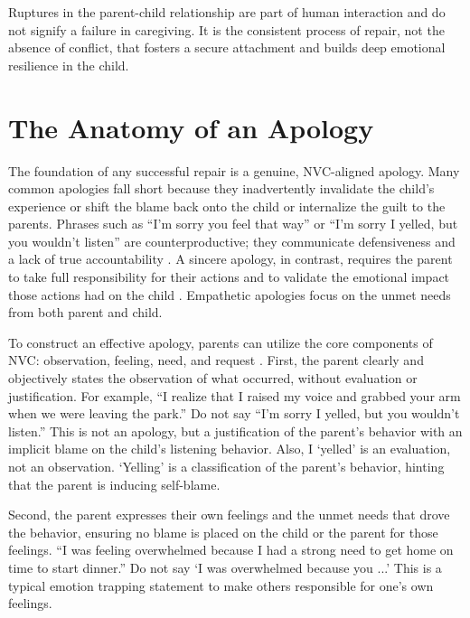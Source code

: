\begin{keyinsight}
Ruptures in the parent-child relationship are part of human interaction and do not signify a failure in caregiving.
It is the consistent process of repair, not the absence of conflict, that fosters a secure attachment and builds deep emotional resilience in the child.
\end{keyinsight}

\section{The Anatomy of an Apology}

The foundation of any successful repair is a genuine, NVC-aligned apology.
Many common apologies fall short because they inadvertently invalidate the child's experience or shift the blame back onto the child or internalize the guilt to the parents.
Phrases such as ``I'm sorry you feel that way'' or ``I'm sorry I yelled, but you wouldn't listen'' are counterproductive; they communicate defensiveness and a lack of true accountability \citep{kohn2005}.
A sincere apology, in contrast, requires the parent to take full responsibility for their actions and to validate the emotional impact those actions had on the child \citep{gottman1997}.
Empathetic apologies focus on the unmet needs from both parent and child.

To construct an effective apology, parents can utilize the core components of NVC: observation, feeling, need, and request \citep{rosenberg2003}.
First, the parent clearly and objectively states the observation of what occurred, without evaluation or justification.
For example, ``I realize that I raised my voice and grabbed your arm when we were leaving the park.''
Do not say ``I'm sorry I yelled, but you wouldn't listen.'' 
This is not an apology, but a justification of the parent's behavior with an implicit blame on the child's listening behavior.
Also, I `yelled' is an evaluation, not an observation.
`Yelling' is a classification of the parent's behavior, hinting that the parent is inducing self-blame.

Second, the parent expresses their own feelings and the unmet needs that drove the behavior, ensuring no blame is placed on the child or the parent for those feelings.
``I was feeling overwhelmed because I had a strong need to get home on time to start dinner.''
Do not say `I was overwhelmed because you ...'
This is a typical emotion trapping statement to make others responsible for one's own feelings.

